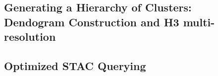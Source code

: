 \begin{multicols}{2}
\subsection{Generating a Hierarchy of Clusters: Dendogram Construction and H3 multi-resolution}

\subsection{Optimized STAC Querying}





\end{multicols}
